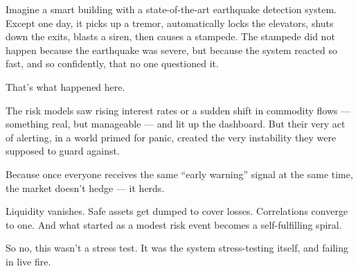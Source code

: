   \medskip


Imagine a smart building with a state-of-the-art earthquake detection system. Except one day, it picks up a tremor, 
automatically locks the elevators, shuts down the exits, blasts a siren, then causes a stampede. 
The stampede did not happen because the earthquake 
was severe, but because the system reacted so fast, and so confidently, that no one questioned it.

That’s what happened here.

The risk models saw rising interest rates or a sudden shift in commodity flows — something real, but manageable — and lit up 
the dashboard. But their very act of alerting, in a world primed for panic, created the very instability they were supposed 
to guard against.

Because once everyone receives the same “early warning” signal at the same time, the market doesn’t hedge — it herds.

Liquidity vanishes. Safe assets get dumped to cover losses. Correlations converge to one. And what started as a modest 
risk event becomes a self-fulfilling spiral.

So no, this wasn’t a stress test.
It was the system stress-testing itself, and failing in live fire.


\medskip

